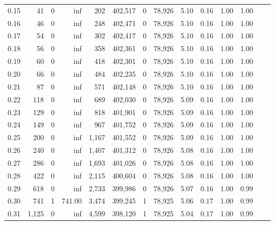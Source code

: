 \begin{tabular}{rrrrrrrrrrrrrr}
0.15 &      41 &      0 &      inf &      202 &  402,517 &       0 &  78,926 &  5.10 &  0.16 &  1.00 &      1.00 \\
0.16 &      46 &      0 &      inf &      248 &  402,471 &       0 &  78,926 &  5.10 &  0.16 &  1.00 &      1.00 \\
0.17 &      54 &      0 &      inf &      302 &  402,417 &       0 &  78,926 &  5.10 &  0.16 &  1.00 &      1.00 \\
0.18 &      56 &      0 &      inf &      358 &  402,361 &       0 &  78,926 &  5.10 &  0.16 &  1.00 &      1.00 \\
0.19 &      60 &      0 &      inf &      418 &  402,301 &       0 &  78,926 &  5.10 &  0.16 &  1.00 &      1.00 \\
0.20 &      66 &      0 &      inf &      484 &  402,235 &       0 &  78,926 &  5.10 &  0.16 &  1.00 &      1.00 \\
0.21 &      87 &      0 &      inf &      571 &  402,148 &       0 &  78,926 &  5.10 &  0.16 &  1.00 &      1.00 \\
0.22 &     118 &      0 &      inf &      689 &  402,030 &       0 &  78,926 &  5.09 &  0.16 &  1.00 &      1.00 \\
0.23 &     129 &      0 &      inf &      818 &  401,901 &       0 &  78,926 &  5.09 &  0.16 &  1.00 &      1.00 \\
0.24 &     149 &      0 &      inf &      967 &  401,752 &       0 &  78,926 &  5.09 &  0.16 &  1.00 &      1.00 \\
0.25 &     200 &      0 &      inf &    1,167 &  401,552 &       0 &  78,926 &  5.09 &  0.16 &  1.00 &      1.00 \\
0.26 &     240 &      0 &      inf &    1,407 &  401,312 &       0 &  78,926 &  5.08 &  0.16 &  1.00 &      1.00 \\
0.27 &     286 &      0 &      inf &    1,693 &  401,026 &       0 &  78,926 &  5.08 &  0.16 &  1.00 &      1.00 \\
0.28 &     422 &      0 &      inf &    2,115 &  400,604 &       0 &  78,926 &  5.08 &  0.16 &  1.00 &      1.00 \\
0.29 &     618 &      0 &      inf &    2,733 &  399,986 &       0 &  78,926 &  5.07 &  0.16 &  1.00 &      0.99 \\
0.30 &     741 &      1 &   741.00 &    3,474 &  399,245 &       1 &  78,925 &  5.06 &  0.17 &  1.00 &      0.99 \\
0.31 &   1,125 &      0 &      inf &    4,599 &  398,120 &       1 &  78,925 &  5.04 &  0.17 &  1.00 &      0.99 \\

\end{tabular}
